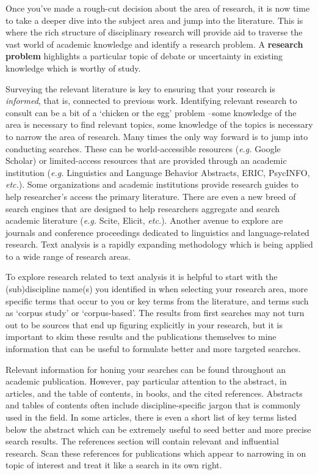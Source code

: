 \documentclass[
  letterpaper,
]{book}
\theoremstyle{definition}
\theoremstyle{remark}
\begin{document}
Once you've made a rough-cut decision about the area of research, it is
now time to take a deeper dive into the subject area and jump into the
literature. This is where the rich structure of disciplinary research
will provide aid to traverse the vast world of academic knowledge and
identify a research problem. A \textbf{research problem} highlights a
particular topic of debate or uncertainty in existing knowledge which is
worthy of study.

Surveying the relevant literature is key to ensuring that your research
is \emph{informed}, that is, connected to previous work. Identifying
relevant research to consult can be a bit of a `chicken or the egg'
problem --some knowledge of the area is necessary to find relevant
topics, some knowledge of the topics is necessary to narrow the area of
research. Many times the only way forward is to jump into conducting
searches. These can be world-accessible resources (\emph{e.g.} Google
Scholar) or limited-access resources that are provided through an
academic institution (\emph{e.g.} Linguistics and Language Behavior
Abstracts, ERIC, PsycINFO, \emph{etc.}). Some organizations and academic
institutions provide research guides to help researcher's access the
primary literature. There are even a new breed of search engines that
are designed to help researchers aggregate and search academic
literature (\emph{e.g.} Scite, Elicit, \emph{etc.}). Another avenue to
explore are journals and conference proceedings dedicated to linguistics
and language-related research. Text analysis is a rapidly expanding
methodology which is being applied to a wide range of research areas.

To explore research related to text analysis it is helpful to start with
the (sub)discipline name(s) you identified in when selecting your
research area, more specific terms that occur to you or key terms from
the literature, and terms such as `corpus study' or `corpus-based'. The
results from first searches may not turn out to be sources that end up
figuring explicitly in your research, but it is important to skim these
results and the publications themselves to mine information that can be
useful to formulate better and more targeted searches.

Relevant information for honing your searches can be found throughout an
academic publication. However, pay particular attention to the abstract,
in articles, and the table of contents, in books, and the cited
references. Abstracts and tables of contents often include
discipline-specific jargon that is commonly used in the field. In some
articles, there is even a short list of key terms listed below the
abstract which can be extremely useful to seed better and more precise
search results. The references section will contain relevant and
influential research. Scan these references for publications which
appear to narrowing in on topic of interest and treat it like a search
in its own right.
\end{document}
